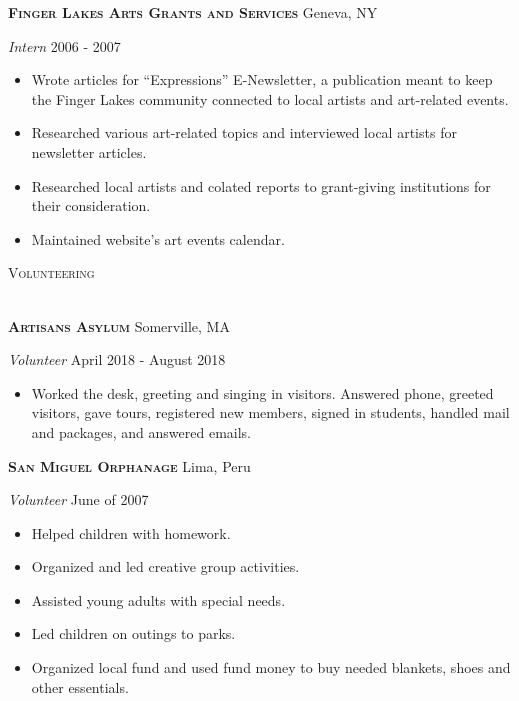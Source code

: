 \documentclass[a4paper]{article}
\newcommand{\lineunder} {
    \vspace*{-8pt} \\
    \hspace*{-18pt} \hrulefill \\
}
\newcommand{\header} [1] {
    {\hspace*{-18pt}\vspace*{6pt} \textsc{#1}}
    \vspace*{-6pt} \lineunder
    \vspace{2mm}
}
\begin{document}
\textbf{\textsc{Finger Lakes Arts Grants and Services}} \hfill Geneva, NY\\
\vspace{2mm}

\begin{addmargin}[1em]{0em}

\textit{Intern} \hfill 2006 - 2007\\
\vspace{-1mm}
\begin{itemize} \itemsep 1pt
    \item Wrote articles for “Expressions” E-Newsletter, a publication meant to keep the
        Finger Lakes community connected to local artists and art-related events.
    \item Researched various art-related topics and interviewed local artists for 
        newsletter articles.
    \item Researched local artists and colated reports to grant-giving institutions for
        their consideration.
    \item Maintained website's art events calendar. 
\end{itemize}

\end{addmargin}


\header{\faHeart \hspace{1pt} Volunteering}

\textbf{\textsc{Artisans Asylum}} \hfill Somerville, MA\\
\begin{addmargin}[1em]{0em}
\vspace{2mm}
\textit{Volunteer} \hfill April 2018 - August 2018\\
\vspace{-1mm}
\begin{itemize} \itemsep 1pt
    \item Worked the desk, greeting and singing in visitors. Answered phone,
    greeted visitors, gave tours, registered new members, signed in students, 
    handled mail and packages, and answered emails.
\end{itemize}
\end{addmargin}

\textbf{\textsc{San Miguel Orphanage}} \hfill Lima, Peru\\
\begin{addmargin}[1em]{0em}
\vspace{2mm}
\textit{Volunteer} \hfill June of 2007\\
\vspace{-1mm}
\begin{itemize} \itemsep 1pt
    \item Helped children with homework.
    \item Organized and led creative group activities.
    \item Assisted young adults with special needs.
    \item Led children on outings to parks.
    \item Organized local fund and used fund money to buy needed blankets, shoes and
        other essentials.
\end{itemize}
\end{addmargin}
\end{document}
